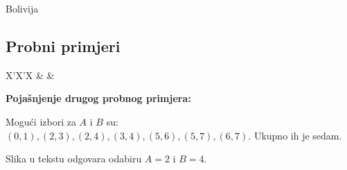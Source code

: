 \begin{statement}[
  problempoints=100,
  timelimit=2 sekunde,
  memorylimit=512 MiB,
]{Bolivija}
\subsection*{Probni primjeri}
\begin{tabularx}{\textwidth}{X'X'X}
 &
 &
\end{tabularx}

\textbf{Pojašnjenje drugog probnog primjera:}

Mogući izbori za $A$ i $B$ su: 
$(0, 1), (2, 3), (2, 4), (3, 4), (5, 6), (5, 7), (6, 7)$. 
Ukupno ih je sedam. 

Slika u tekstu odgovara odabiru $A = 2$ i $B = 4$.

\end{statement}

